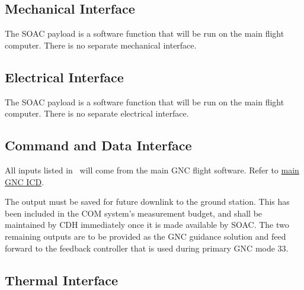 \documentclass[10pt]{article}
\begin{document}

\subsection{Mechanical Interface}\label{sec2:mech_interface}

The SOAC payload is a software function that will be run on the main flight computer. There is no separate mechanical interface.

\subsection{Electrical Interface}\label{sec2:elec_interface}

The SOAC payload is a software function that will be run on the main flight computer. There is no separate electrical interface.

\subsection{Command and Data Interface}\label{sec2:cmd_interface}

All inputs listed in~ will come from the main GNC flight software. Refer to \href{https://drive.google.com/open?id=1wTjmsQdXGk9jmEHy59fZAdBJJ3r1IE4LGFjHT2S5png}{main GNC ICD}.

The output  must be saved for future downlink to the ground station. This has been included in the COM system's measurement budget, and shall be maintained by CDH immediately once it is made available by SOAC. The two remaining outputs are to be provided as the GNC guidance solution and feed forward to the feedback controller that is used during primary GNC mode $33$. 

\subsection{Thermal Interface}\label{sec2:thermal_interface}
\end{document}
